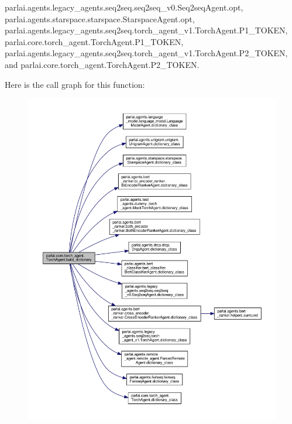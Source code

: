 parlai.\+agents.\+legacy\+\_\+agents.\+seq2seq.\+seq2seq\+\_\+v0.\+Seq2seq\+Agent.\+opt, parlai.\+agents.\+starspace.\+starspace.\+Starspace\+Agent.\+opt, parlai.\+agents.\+legacy\+\_\+agents.\+seq2seq.\+torch\+\_\+agent\+\_\+v1.\+Torch\+Agent.\+P1\+\_\+\+T\+O\+K\+EN, parlai.\+core.\+torch\+\_\+agent.\+Torch\+Agent.\+P1\+\_\+\+T\+O\+K\+EN, parlai.\+agents.\+legacy\+\_\+agents.\+seq2seq.\+torch\+\_\+agent\+\_\+v1.\+Torch\+Agent.\+P2\+\_\+\+T\+O\+K\+EN, and parlai.\+core.\+torch\+\_\+agent.\+Torch\+Agent.\+P2\+\_\+\+T\+O\+K\+EN.

Here is the call graph for this function\+:
\nopagebreak
\begin{figure}[H]
\begin{center}
\leavevmode
\includegraphics[width=350pt]{classparlai_1_1core_1_1torch__agent_1_1TorchAgent_a233316f9ec2805dd6a08fbf07f3a078a_cgraph}
\end{center}
\end{figure}
\mbox{\label{classparlai_1_1core_1_1torch__agent_1_1TorchAgent_ab22f61f153b522f429210c61eed2d5af}} 
